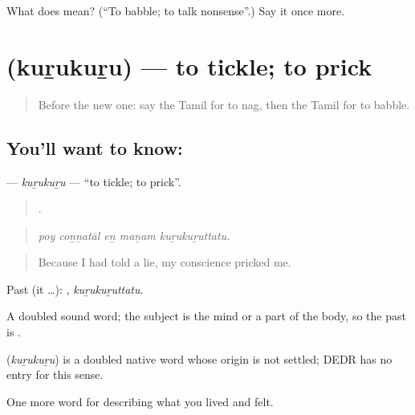 \begin{tcolorbox}[breakable,colback=teal!4,colframe=teal!35!black,title={Before you move on}]
What does  mean? (\textquotedblleft{}To babble; to talk nonsense\textquotedblright{}.) Say it once more.
\end{tcolorbox}
\section[\texorpdfstring{\ta{குறுகுறு} (kuṟukuṟu)}{குறுகுறு (kuṟukuṟu)}]{ (kuṟukuṟu) — to tickle; to prick}

\label{lesson:TA-C467-kurukuru}



\begin{quote}
Before the new one: say the Tamil for to nag, then the Tamil for to babble.
\end{quote}

\subsection*{You'll want to know: }
\textbf{} — \emph{kuṟukuṟu} — \textquotedblleft{}to tickle; to prick\textquotedblright{}.

\begin{quote}
    .
\end{quote}

\begin{quote}
\emph{poy coṉṉatāl eṉ maṉam kuṟukuṟuttatu.}
\end{quote}

\begin{quote}
Because I had told a lie, my conscience pricked me.
\end{quote}

Past (it …): , \emph{kuṟukuṟuttatu}.

A doubled sound word; the subject is the mind or a part of the body, so the past is .

\begin{cousinweb}
\textbf{} (\emph{kuṟukuṟu}) is a doubled native word whose origin is not settled; DEDR has no entry for this sense.
\end{cousinweb}

\begin{grammarlens}[title={What you've built}]
One more word for describing what you lived and felt.
\end{grammarlens}


